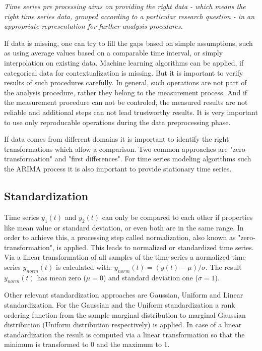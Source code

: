 \documentclass[a4paper,10pt]{scrbook}
\begin{document}
\textit{Time series pre processing aims on providing the right data - which means the right time series data, grouped according to a particular research question - in an appropriate representation for further analysis procedures.}
 
If data is missing, one can try to fill the gaps based on simple assumptions, such as using average values based on a comparable time interval, or simply interpolation on existing data. Machine learning algorithms can be applied, if categorical data for contextualization is missing. But it is important to verify results of such procedures carefully. In general, such operations are not part of the analysis procedure, rather they belong to the measurement process. And if the measurement procedure can not be controled, the measured results are not reliable and additional steps can not lead trustworthy results. It is very important to use only reproducable operations during the data preprocessing phase. 

If data comes from different domains it is important to identify the right transformations which allow a comparison. Two common approaches are "zero-transformation" and "first differences". For time series modeling algorithms such the ARIMA process it is also important to provide stationary time series. 

\subsection{Standardization}
\label{sec.standardization} 
Time series $y_1(t)$ and $y_2(t)$ can only be compared to each other if properties like mean value or standard deviation, or even both are in the same range. In order to achieve this, a processing step called normalization, also known as "zero-transformation", is applied. This leads to normalized or standardized time series. Via a linear transformation of all samples of the time series a normalized time series $y_{norm}(t)$ is calculated with: $y_{norm}(t) = (y(t) - \mu) / \sigma$. The result $y_{norm}(t)$ has mean zero ($\mu=0$) and standard deviation one ($\sigma=1$).

Other relevant standardization approaches are Gaussian, Uniform and Linear standardization. 
For the Gaussian and the Uniform standardization a rank ordering function from the sample marginal distribution to marginal Gaussian distribution (Uniform distribution respectively) is applied. In case of a linear standardization the result is computed via a linear transformation so that the minimum is transformed to 0 and the maximum to 1.
\end{document}
